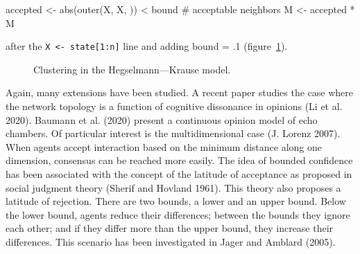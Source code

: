 \documentclass[
  a4paper,
  DIV=11,
  numbers=noendperiod,
  oneside]{scrreprt}
\newenvironment{Shaded}{}{}
\newcommand{\CommentTok}[1]{\textcolor[rgb]{0.42,0.45,0.49}{#1}}
\newcommand{\FunctionTok}[1]{\textcolor[rgb]{0.44,0.26,0.76}{#1}}
\newcommand{\NormalTok}[1]{\textcolor[rgb]{0.14,0.16,0.18}{#1}}
\newcommand{\OtherTok}[1]{\textcolor[rgb]{0.44,0.26,0.76}{#1}}
\newcommand{\SpecialCharTok}[1]{\textcolor[rgb]{0.00,0.36,0.77}{#1}}
\newcommand{\StringTok}[1]{\textcolor[rgb]{0.01,0.18,0.38}{#1}}
\begin{document}
\begin{Shaded}
\begin{Highlighting}[]
\NormalTok{accepted }\OtherTok{\textless{}{-}} \FunctionTok{abs}\NormalTok{(}\FunctionTok{outer}\NormalTok{(X, X, }\StringTok{\textquotesingle{}{-}\textquotesingle{}}\NormalTok{)) }\SpecialCharTok{\textless{}}\NormalTok{ bound }\CommentTok{\# acceptable neighbors}
\NormalTok{M }\OtherTok{\textless{}{-}}\NormalTok{ accepted }\SpecialCharTok{*}\NormalTok{ M}
\end{Highlighting}
\end{Shaded}

after the \texttt{X\ \textless{}-\ state{[}1:n{]}} line and adding bound
= .1 (figure~\ref{fig-ch7-img9-old-97}).

\begin{figure}


\caption{\label{fig-ch7-img9-old-97}Clustering in the
Hegselmann---Krause model.}

\end{figure}%

Again, many extensions have been studied. A recent paper studies the
case where the network topology is a function of cognitive dissonance in
opinions (Li et al. 2020). Baumann et al. (2020) present a continuous
opinion model of echo chambers. Of particular interest is the
multidimensional case (J. Lorenz 2007). When agents accept interaction
based on the minimum distance along one dimension, consensus can be
reached more easily. The idea of bounded confidence has been associated
with the concept of the latitude of acceptance as proposed in social
judgment theory (Sherif and Hovland 1961). This theory also proposes a
latitude of rejection. There are two bounds, a lower and an upper bound.
Below the lower bound, agents reduce their differences; between the
bounds they ignore each other; and if they differ more than the upper
bound, they increase their differences. This scenario has been
investigated in Jager and Amblard (2005).
\end{document}
